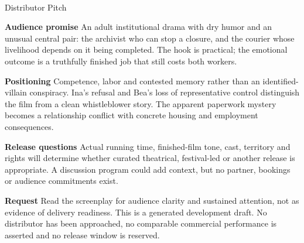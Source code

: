 \documentclass[11pt,letterpaper]{article}
\begin{document}
\begin{center}
{\Large\bfseries\sffamily \filmtitleupper}\\[6pt]
Distributor Pitch
\end{center}
\textbf{Audience promise} An adult institutional drama with dry humor and an unusual central pair: the archivist who can stop a closure, and the courier whose livelihood depends on it being completed. The hook is practical; the emotional outcome is a truthfully finished job that still costs both workers.

\textbf{Positioning} Competence, labor and contested memory rather than an identified-villain conspiracy. Ina's refusal and Bea's loss of representative control distinguish the film from a clean whistleblower story. The apparent paperwork mystery becomes a relationship conflict with concrete housing and employment consequences.

\textbf{Release questions} Actual running time, finished-film tone, cast, territory and rights will determine whether curated theatrical, festival-led or another release is appropriate. A discussion program could add context, but no partner, bookings or audience commitments exist.

\textbf{Request} Read the screenplay for audience clarity and sustained attention, not as evidence of delivery readiness. This is a generated development draft. No distributor has been approached, no comparable commercial performance is asserted and no release window is reserved.
\end{document}
